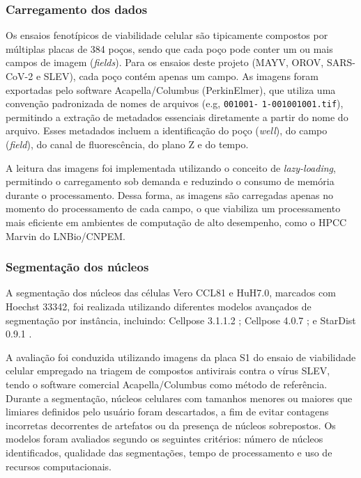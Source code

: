 \documentclass[12pt]{article}
\def\eg{e.g\onedot} \def\Eg{E.g\onedot}
\begin{document}
\subsubsection{Carregamento dos dados}

Os ensaios fenotípicos de viabilidade celular são tipicamente compostos por múltiplas placas de 384 poços, sendo que cada poço pode conter um ou mais campos de imagem (\textit{fields}). Para os ensaios deste projeto (MAYV, OROV, SARS-CoV-2 e SLEV), cada poço contém apenas um campo. As imagens foram exportadas pelo software Acapella/Columbus (PerkinElmer), que utiliza uma convenção padronizada de nomes de arquivos (\eg, \texttt{001001-} \texttt{1-001001001.tif}), permitindo a extração de metadados essenciais diretamente a partir do nome do arquivo. Esses metadados incluem a identificação do poço (\textit{well}), do campo (\textit{field}), do canal de fluorescência, do plano Z e do tempo.

A leitura das imagens foi implementada utilizando o conceito de \textit{lazy-loading}, permitindo o carregamento sob demanda e reduzindo o consumo de memória durante o processamento. Dessa forma, as imagens são carregadas apenas no momento do processamento de cada campo, o que viabiliza um processamento mais eficiente em ambientes de computação de alto desempenho, como o HPCC Marvin do LNBio/CNPEM.

\subsubsection{Segmentação dos núcleos}

A segmentação dos núcleos das células Vero CCL81 e HuH7.0, marcados com Hoechst 33342, foi realizada utilizando diferentes modelos avançados de segmentação por instância, incluindo: Cellpose 3.1.1.2 \cite{Stringer2020,Stringer2025}; Cellpose 4.0.7 \cite{Pachitariu2025}; e StarDist 0.9.1 \cite{Schmidt2018,Weigert2020,Weigert2022}.

A avaliação foi conduzida utilizando imagens da placa S1 do ensaio de viabilidade celular empregado na triagem de compostos antivirais contra o vírus SLEV, tendo o software comercial Acapella/Columbus como método de referência. Durante a segmentação, núcleos celulares com tamanhos menores ou maiores que limiares definidos pelo usuário foram descartados, a fim de evitar contagens incorretas decorrentes de artefatos ou da presença de núcleos sobrepostos. Os modelos foram avaliados segundo os seguintes critérios: número de núcleos identificados, qualidade das segmentações, tempo de processamento e uso de recursos computacionais.
\end{document}
